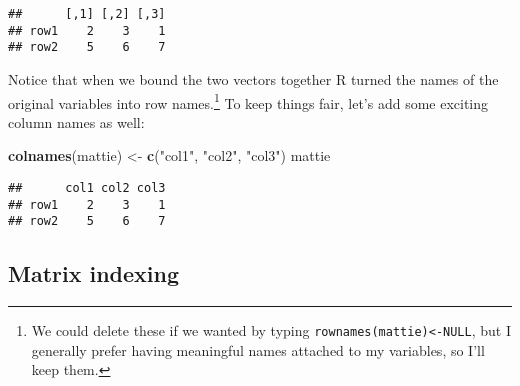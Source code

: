 \documentclass[]{book}
\newenvironment{Shaded}{\begin{snugshade}}{\end{snugshade}}
\newcommand{\KeywordTok}[1]{\textcolor[rgb]{0.13,0.29,0.53}{\textbf{#1}}}
\newcommand{\NormalTok}[1]{#1}
\newcommand{\StringTok}[1]{\textcolor[rgb]{0.31,0.60,0.02}{#1}}
\let\rmarkdownfootnote\footnote%
\def\footnote{\protect\rmarkdownfootnote}
\begin{document}
\begin{verbatim}
##      [,1] [,2] [,3]
## row1    2    3    1
## row2    5    6    7
\end{verbatim}

Notice that when we bound the two vectors together R turned the names of the original variables into row names.\footnote{We could delete these if we wanted by typing \texttt{rownames(mattie)\textless{}-NULL}, but I generally prefer having meaningful names attached to my variables, so I'll keep them.} To keep things fair, let's add some exciting column names as well:

\begin{Shaded}
\begin{Highlighting}[]
\KeywordTok{colnames}\NormalTok{(mattie) <-}\StringTok{ }\KeywordTok{c}\NormalTok{(}\StringTok{"col1"}\NormalTok{, }\StringTok{"col2"}\NormalTok{, }\StringTok{"col3"}\NormalTok{)}
\NormalTok{mattie}
\end{Highlighting}
\end{Shaded}

\begin{verbatim}
##      col1 col2 col3
## row1    2    3    1
## row2    5    6    7
\end{verbatim}

\hypertarget{matrix-indexing}{%
\subsection{Matrix indexing}\label{matrix-indexing}}
\end{document}
